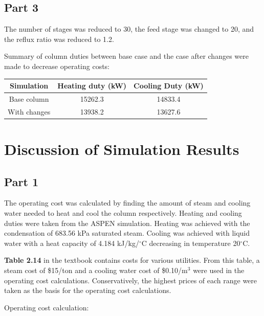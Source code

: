 \documentclass[12pt]{article}
\begin{document}
\subsection{Part 3}

The number of stages was reduced to 30, the feed stage was changed to 20, and the reflux ratio was reduced to 1.2.

Summary of column duties between base case and the case after changes were made to decrease operating costs:

\begin{tabular}{|c|c|c|}
    \hline
    Simulation & Heating duty (kW) & Cooling Duty (kW) \\
    \hline
    Base column & 15262.3 & 14833.4 \\
    With changes & 13938.2 & 13627.6 \\
    \hline
\end{tabular}



\section{Discussion of Simulation Results}

\subsection{Part 1}

The operating cost was calculated by finding the amount of steam and cooling water needed to heat and cool the column respectively. Heating and cooling duties were taken from the ASPEN simulation. Heating was achieved with the condensation of 683.56 kPa saturated steam. Cooling was achieved with liquid water with a heat capacity of 4.184 kJ/kg/$^\circ$C decreasing in temperature 20$^\circ$C.

\textbf{Table 2.14} in the textbook contains costs for various utilities. From this table, a steam cost of \$15/ton and a cooling water cost of \$0.10/m$^3$ were used in the operating cost calculations. Conservatively, the highest prices of each range were taken as the basis for the operating cost calculations.

Operating cost calculation:
\end{document}
